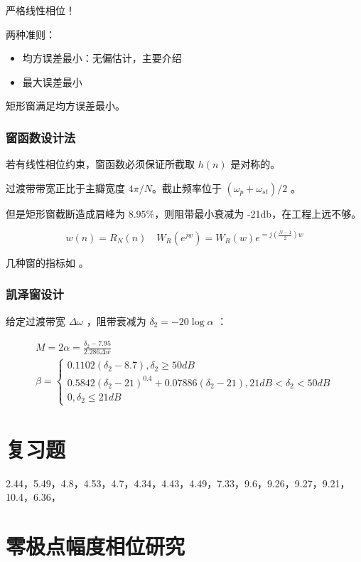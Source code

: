 \documentclass[cn,11pt,chinese,black,simple]{elegantbook}
\begin{document}
严格线性相位！

两种准则：

\begin{itemize}
    \item 均方误差最小：无偏估计，主要介绍
    \item 最大误差最小
\end{itemize}

矩形窗满足均方误差最小。

\subsection{窗函数设计法}

若有线性相位约束，窗函数必须保证所截取 \(h(n)\) 是对称的。

过渡带带宽正比于主瓣宽度 \(4 \pi / N\)。截止频率位于 \((\omega_p + \omega_{st}) / 2\) 。

但是矩形窗截断造成肩峰为 \(8.95 \%\)，则阻带最小衰减为 -21db，在工程上远不够。

\[
w(n)=R_{N}(n) \quad W_{R}\left(e^{j w}\right)=W_{R}(w) e^{=j\left(\frac{N-1}{2}\right) w}
\]

几种窗的指标如 。


\subsection{凯泽窗设计}

给定过渡带宽 \(\Delta \omega\) ，阻带衰减为 \(\delta_2 = -20 \log \alpha\) ：

\[
\begin{array}{l}
M=2 \alpha=\frac{\delta_{2}-7.95}{2.286 \Delta w} \\
\beta=\left\{\begin{array}{l}
0.1102\left(\delta_{2}-8.7\right), \delta_{2} \geq 50 d B \\
0.5842\left(\delta_{2}-21\right)^{0.4}+0.07886\left(\delta_{2}-21\right), 21 d B<\delta_{2}<50 d B \\
0, \delta_{2} \leq 21 d B
\end{array}\right.
\end{array}
\]

\chapter{复习题}

2.44，5.49，4.8，4.53，4.7，4.34，4.43，4.49，7.33，9.6，9.26，9.27，9.21，10.4，6.36，


\appendix

\chapter{零极点幅度相位研究}




\let\chapname\undefined
\ifx\mainclass\undefined
\end{document}
